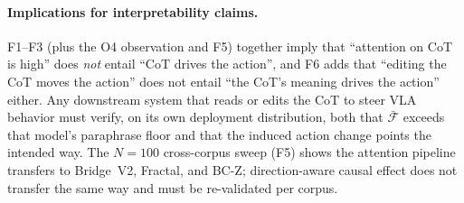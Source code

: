 \documentclass{article}
\begin{document}
\paragraph{Implications for interpretability claims.} F1--F3 (plus the O4 observation and F5) together imply that ``attention on CoT is high'' does \emph{not} entail ``CoT drives the action'', and F6 adds that ``editing the CoT moves the action'' does not entail ``the CoT's meaning drives the action'' either. Any downstream system that reads or edits the CoT to steer VLA behavior must verify, on its own deployment distribution, both that $\bar{\mathcal{F}}$ exceeds that model's paraphrase floor and that the induced action change points the intended way. The $N{=}100$ cross-corpus sweep (F5) shows the attention pipeline transfers to Bridge~V2, Fractal, and BC-Z; direction-aware causal effect does not transfer the same way and must be re-validated per corpus.
\end{document}
